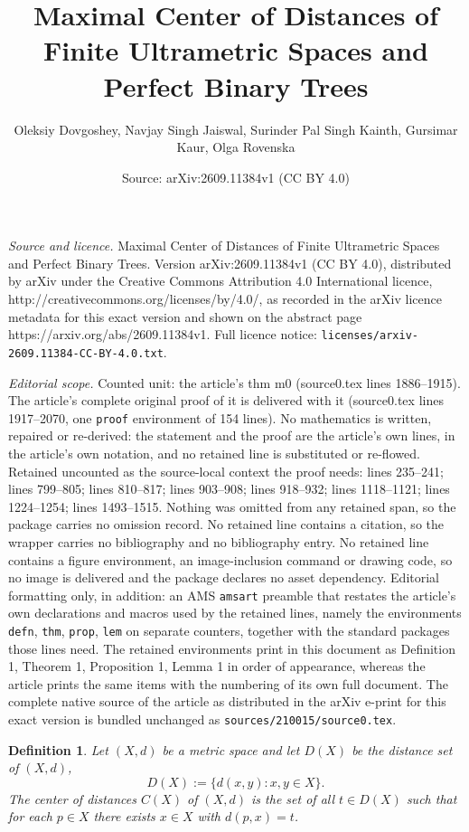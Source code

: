 \documentclass[10pt,a4paper]{amsart}
\title{Maximal Center of Distances of Finite Ultrametric Spaces and Perfect Binary Trees}
\author{Oleksiy Dovgoshey, Navjay Singh Jaiswal, Surinder Pal Singh Kainth, Gursimar Kaur, Olga Rovenska}
\date{Source: arXiv:2609.11384v1 (CC BY 4.0)}
\newtheorem{defn}{Definition}
\begin{document}
\maketitle

\noindent\emph{Source and licence.} Maximal Center of Distances of Finite Ultrametric Spaces and Perfect Binary Trees. Version arXiv:2609.11384v1 (CC BY 4.0), distributed by arXiv under the Creative Commons Attribution 4.0 International licence, http://creativecommons.org/licenses/by/4.0/, as recorded in the arXiv licence metadata for this exact version and shown on the abstract page https://arxiv.org/abs/2609.11384v1. Full licence notice: \texttt{licenses/arxiv-2609.11384-CC-BY-4.0.txt}.\par\smallskip

\noindent\textit{Editorial scope.} Counted unit: the article's thm m0 (source0.tex lines 1886--1915). The article's complete original proof of it is delivered with it (source0.tex lines 1917--2070, one \texttt{proof} environment of 154 lines). No mathematics is written, repaired or re-derived: the statement and the proof are the article's own lines, in the article's own notation, and no retained line is substituted or re-flowed.  Retained uncounted as the source-local context the proof needs: lines 235--241; lines 799--805; lines 810--817; lines 903--908; lines 918--932; lines 1118--1121; lines 1224--1254; lines 1493--1515.  Nothing was omitted from any retained span, so the package carries no omission record.  No retained line contains a citation, so the wrapper carries no bibliography and no bibliography entry.  No retained line contains a figure environment, an image-inclusion command or drawing code, so no image is delivered and the package declares no asset dependency.  Editorial formatting only, in addition: an AMS \texttt{amsart} preamble that restates the article's own declarations and macros used by the retained lines, namely the environments \texttt{defn}, \texttt{thm}, \texttt{prop}, \texttt{lem} on separate counters, together with the standard packages those lines need.  The retained environments print in this document as Definition 1, Theorem 1, Proposition 1, Lemma 1 in order of appearance, whereas the article prints the same items with the numbering of its own full document.  The complete native source of the article as distributed in the arXiv e-print for this exact version is bundled unchanged as \texttt{sources/210015/source0.tex}.
\begin{defn}\label{zcgh572}
Let $(X,d)$ be a metric space and let $D(X)$ be the distance set of $(X,d)$,
\begin{equation*}
D(X) := \{ d(x,y) : x,y \in X \}.
\end{equation*}
The {\it center of distances} $C(X)$  of $(X,d)$ is the set of all $t\in D(X)$ such that for each $p\in X$  there exists $x\in X$ with $d(p,x)=t$.
\end{defn}
\end{document}
